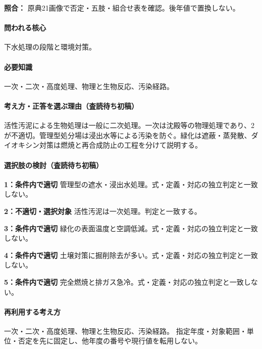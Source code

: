 \noindent\textbf{照合：} 原典21画像で否定・五肢・組合せ表を確認。後年値で置換しない。\par

\paragraph{問われる核心} 下水処理の段階と環境対策。

\paragraph{必要知識} 一次・二次・高度処理、物理と生物反応、汚染経路。

\paragraph{考え方・正答を選ぶ理由（査読待ち初稿）} 活性汚泥による生物処理は一般に二次処理。一次は沈殿等の物理処理であり、2が不適切。管理型処分場は浸出水等による汚染を防ぐ。緑化は遮蔽・蒸発散、ダイオキシン対策は燃焼と再合成防止の工程を分けて説明する。

\paragraph{選択肢の検討（査読待ち初稿）}\mbox{}\par

\noindent\textbf{1：条件内で適切} 管理型の遮水・浸出水処理。式・定義・対応の独立判定と一致しない。\par

\noindent\textbf{2：不適切・選択対象} 活性汚泥は一次処理。判定と一致する。\par

\noindent\textbf{3：条件内で適切} 緑化の表面温度と空調低減。式・定義・対応の独立判定と一致しない。\par

\noindent\textbf{4：条件内で適切} 土壌対策に掘削除去が多い。式・定義・対応の独立判定と一致しない。\par

\noindent\textbf{5：条件内で適切} 完全燃焼と排ガス急冷。式・定義・対応の独立判定と一致しない。\par

\paragraph{再利用する考え方} 一次・二次・高度処理、物理と生物反応、汚染経路。 指定年度・対象範囲・単位・否定を先に固定し、他年度の番号や現行値を転用しない。


